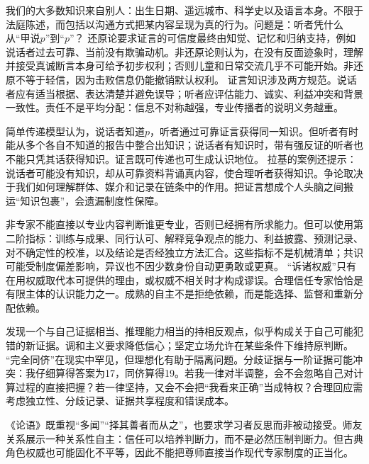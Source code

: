 我们的大多数知识来自别人：出生日期、遥远城市、科学史以及语言本身。不限于法庭陈述，而包括以沟通方式把某内容呈现为真的行为。问题是：听者凭什么从“甲说$p$”到“$p$”？ 还原论要求证言的可信度最终由知觉、记忆和归纳支持，例如说话者过去可靠、当前没有欺骗动机。非还原论则认为，在没有反面迹象时，理解并接受真诚断言本身可给予初步权利；否则儿童和日常交流几乎不可能开始。非还原不等于轻信，因为击败信息仍能撤销默认权利\parencite{burge1993,lackey2008}。 证言知识涉及两方规范。说话者应有适当根据、表达清楚并避免误导；听者应评估能力、诚实、利益冲突和背景一致性。责任不是平均分配：信息不对称越强，专业传播者的说明义务越重。

简单传递模型认为，说话者知道$p$，听者通过可靠证言获得同一知识。但听者有时能从多个各自不知道的报告中整合出知识；说话者有知识时，带有强反证的听者也不能只凭其话获得知识。证言既可传递也可生成认识地位。 拉基的案例还提示：说话者可能没有知识，却从可靠资料背诵真内容，使合理听者获得知识\parencite{lackey2008}。争论取决于我们如何理解群体、媒介和记录在链条中的作用。把证言想成个人头脑之间搬运“知识包裹”，会遗漏制度性保障。

非专家不能直接以专业内容判断谁更专业，否则已经拥有所求能力。但可以使用第二阶指标：训练与成果、同行认可、解释竞争观点的能力、利益披露、预测记录、对不确定性的校准，以及结论是否经独立方法汇合\parencite{goldman2001}。这些指标不是机械清单；共识可能受制度偏差影响，异议也不因少数身份自动更勇敢或更真。 “诉诸权威”只有在用权威取代本可提供的理由，或权威不相关时才构成谬误。合理信任专家恰恰是有限主体的认识能力之一。成熟的自主不是拒绝依赖，而是能选择、监督和重新分配依赖\parencite{hardwig1985}。

发现一个与自己证据相当、推理能力相当的持相反观点，似乎构成关于自己可能犯错的新证据。调和主义要求降低信心；坚定立场允许在某些条件下维持原判断\parencite{christensen2007,kelly2005}。 “完全同侪”在现实中罕见，但理想化有助于隔离问题。分歧证据与一阶证据可能冲突：我仔细算得答案为17，同侪算得19。若我一律对半调整，会不会忽略自己对计算过程的直接把握？若一律坚持，又会不会把“我看来正确”当成特权？合理回应需考虑独立性、分歧记录、证据共享程度和错误成本。

\begin{comparison}
《论语》既重视“多闻”“择其善者而从之”，也要求学习者反思而非被动接受。师友关系展示一种关系性自主：信任可以培养判断力，而不是必然压制判断力。但古典角色权威也可能固化不平等，因此不能把尊师直接当作现代专家制度的正当化。
\end{comparison}


